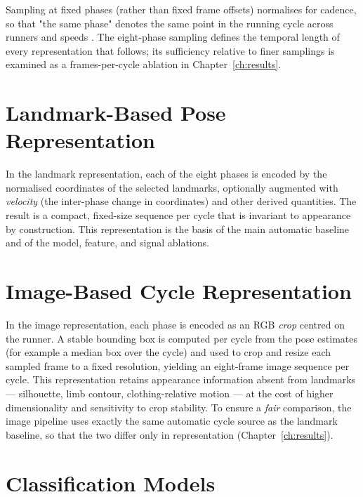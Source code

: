 Sampling at fixed phases (rather than fixed frame offsets) normalises for
cadence, so that "the same phase" denotes the same point in the running cycle
across runners and speeds \cite{inostroza2025runningcycle}. The eight-phase
sampling defines the temporal length of every representation that follows; its
sufficiency relative to finer samplings is examined as a frames-per-cycle
ablation in Chapter~\ref{ch:results}.

\section{Landmark-Based Pose Representation}
\label{sec:method-landmark-rep}

In the landmark representation, each of the eight phases is encoded by the
normalised coordinates of the selected landmarks, optionally augmented with
\emph{velocity} (the inter-phase change in coordinates) and other derived
quantities. The result is a compact, fixed-size sequence per cycle that is
invariant to appearance by construction. This representation is the basis of the
main automatic baseline and of the model, feature, and signal ablations.

\section{Image-Based Cycle Representation}
\label{sec:method-image-rep}

In the image representation, each phase is encoded as an RGB \emph{crop} centred
on the runner. A stable bounding box is computed per cycle from the pose
estimates (for example a median box over the cycle) and used to crop and resize
each sampled frame to a fixed resolution, yielding an eight-frame image sequence
per cycle. This representation retains appearance information absent from
landmarks --- silhouette, limb contour, clothing-relative motion --- at the cost
of higher dimensionality and sensitivity to crop stability. To ensure a
\emph{fair} comparison, the image pipeline uses exactly the same automatic cycle
source as the landmark baseline, so that the two differ only in representation
(Chapter~\ref{ch:results}).

\section{Classification Models}
\label{sec:method-models}

